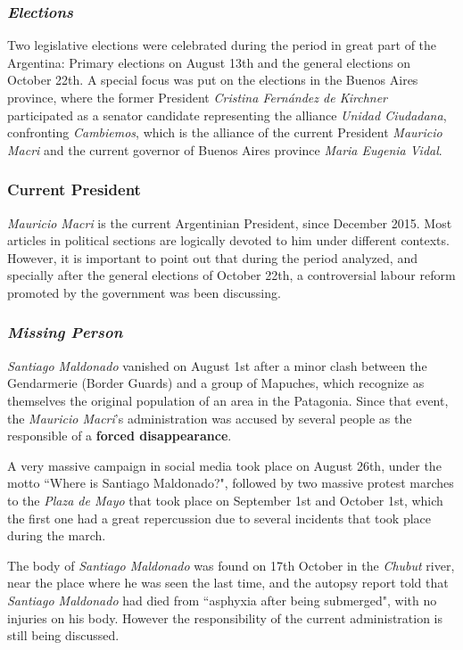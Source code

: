 \documentclass{bmcart}
\begin{document}
\subsubsection*{\emph{Elections}}
\par Two legislative elections were celebrated during the period in great part of the Argentina: Primary elections on August 13th and the general elections on October 22th. 
A special focus was put on the elections in the Buenos Aires province, where the former President \emph{Cristina Fern\'andez de Kirchner} participated as a senator candidate representing the alliance \emph{Unidad Ciudadana}, confronting \emph{Cambiemos}, which is the alliance of the current President \emph{Mauricio Macri} and the current governor of Buenos Aires province \emph{Maria Eugenia Vidal}.
 
\subsubsection*{Current President}
\par \emph{Mauricio Macri} is the current Argentinian President, since December 2015. 
Most articles in political sections are logically devoted to him under different contexts.
However, it is important to point out that during the period analyzed, and specially after the general elections of October 22th, a controversial labour reform promoted by the government was been discussing.

\subsubsection*{\emph{Missing Person}}
\par \emph{Santiago Maldonado} vanished on August 1st after a minor clash between the Gendarmerie (Border Guards) and a group of Mapuches, which recognize as themselves the original population of an area in the Patagonia.
Since that event, the \emph{Mauricio Macri}'s administration was accused by several people as the responsible of a \textbf{forced disappearance}. 
\par A very massive campaign in social media took place on August 26th, under the motto ``Where is Santiago Maldonado?", followed by two massive protest marches to the \emph{Plaza de Mayo} that took place on September 1st and October 1st, which the first one had a great repercussion due to several incidents that took place during the march.
\par The body of \emph{Santiago Maldonado} was found on 17th October in the \emph{Chubut} river, near the place where he was seen the last time, and the autopsy report told that \emph{Santiago Maldonado} had died from ``asphyxia after being submerged", with no injuries on his body. 
However the responsibility of the current administration is still being discussed.
\end{document}
